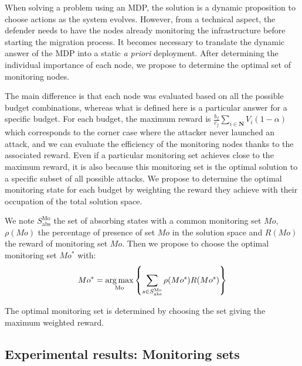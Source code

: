 When solving a problem using an MDP, the solution is a dynamic proposition to choose actions as the system evolves.
However, from a technical aspect, the defender needs to have the nodes already monitoring the infrastructure before starting the migration process.
It becomes necessary to translate the dynamic answer of the MDP into a static \textit{a priori} deployment.
After determining the individual importance of each node, we propose to determine the optimal set of monitoring nodes.

The main difference is that each node was evaluated based on all the possible budget combinations, whereas what is defined here is a particular answer for a specific budget.
For each budget, the maximum reward is $\frac{b_f}{c_f} \sum\limits_{i \in \textbf{N}}V_i(1-\alpha) $ which corresponds to the corner case where the attacker never launched an attack, and we can evaluate the efficiency of the  monitoring nodes thanks to the associated reward.
Even if a particular monitoring set achieves close to the maximum reward, it is also because this monitoring set is the optimal solution to a specific subset of all possible attacks.
We propose to determine the optimal monitoring state for each budget by weighting the reward they achieve with their occupation of the total solution space.

We note $S^{\text{Mo}}_{\text{abs}}$ the set of absorbing states with a common  monitoring set $Mo$, $\rho(Mo)$ the percentage of presence of set $Mo$ in the solution space and $R(Mo)$ the reward of monitoring set $Mo$.
Then we propose to choose the optimal monitoring set $Mo^*$ with:
\begin{equation}
    Mo^* = \operatorname*{arg\,max}\limits_{\text{Mo}} \left \{\sum\limits_{s \in S^{\text{Mo}}_{\text{abs}}}\rho(Mo^s)R(Mo^s) \right \}
\end{equation}

The optimal monitoring set is determined by choosing the set giving the maximum weighted reward.




\subsection{Experimental results: Monitoring sets}

